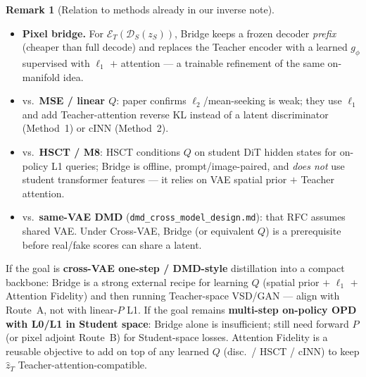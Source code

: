 \documentclass[11pt,a4paper]{article}
\newcommand{\Enc}{\mathcal{E}}
\newcommand{\Dec}{\mathcal{D}}
\theoremstyle{definition}
\newtheorem{remark}{Remark}
\begin{document}
\begin{remark}[Relation to methods already in our inverse note]
\label{rem:vs-methods}
\begin{itemize}[leftmargin=1.4em,itemsep=2pt]
  \item \textbf{Pixel bridge.} For $\Enc_T(\Dec_S(z_S))$, Bridge keeps a frozen decoder
        \emph{prefix} (cheaper than full decode) and replaces the Teacher encoder with a
        learned $g_\phi$ supervised with $\ell_1$ $+$ attention --- a trainable
        refinement of the same on-manifold idea.
  \item vs.\ \textbf{MSE / linear $Q$}: paper confirms $\ell_2$/mean-seeking is weak;
        they use $\ell_1$ and add Teacher-attention reverse KL instead of a latent
        discriminator (Method~1) or cINN (Method~2).
  \item vs.\ \textbf{HSCT / M8}: HSCT conditions $Q$ on student DiT hidden states for
        on-policy L1 queries; Bridge is offline, prompt/image-paired, and
        \emph{does not} use student transformer features --- it relies on VAE spatial
        prior $+$ Teacher attention.
  \item vs.\ \textbf{same-VAE DMD} (\texttt{dmd\_cross\_model\_design.md}): that RFC
        assumes shared VAE. Under Cross-VAE, Bridge (or equivalent $Q$) is a
        prerequisite before real/fake scores can share a latent.
\end{itemize}
\end{remark}

\begin{tcolorbox}[colback=blue!4,colframe=blue!50!black,title=Takeaway for Flow-Factory XOPD]
If the goal is \textbf{cross-VAE one-step / DMD-style} distillation into a compact
backbone: Bridge is a strong external recipe for learning $Q$ (spatial prior $+$
$\ell_1$ $+$ Attention Fidelity) and then running Teacher-space VSD/GAN --- align with
Route~A, not with linear-$P$ L1.
If the goal remains \textbf{multi-step on-policy OPD with L0/L1 in Student space}:
Bridge alone is insufficient; still need forward $P$ (or pixel adjoint Route~B) for
Student-space losses. Attention Fidelity is a reusable objective to add on top of any
learned $Q$ (disc.\ / HSCT / cINN) to keep $\hat z_T$ Teacher-attention-compatible.
\end{tcolorbox}
\end{document}
